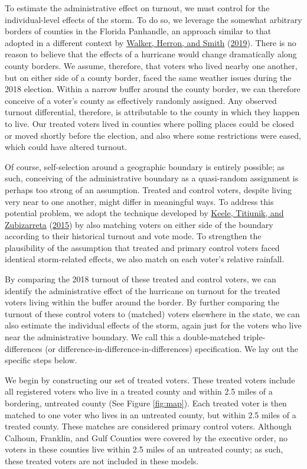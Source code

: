 \documentclass[
  12pt,
]{article}
\begin{document}
To estimate the administrative effect on turnout, we must control for the individual-level effects of the storm. To do so, we leverage the somewhat arbitrary borders of counties in the Florida Panhandle, an approach similar to that adopted in a different context by \protect\hyperlink{ref-Walker2019}{Walker, Herron, and Smith} (\protect\hyperlink{ref-Walker2019}{2019}). There is no reason to believe that the effects of a hurricane would change dramatically along county borders. We assume, therefore, that voters who lived nearby one another, but on either side of a county border, faced the same weather issues during the 2018 election. Within a narrow buffer around the county border, we can therefore conceive of a voter's county as effectively randomly assigned. Any observed turnout differential, therefore, is attributable to the county in which they happen to live. Our treated voters lived in counties where polling places could be closed or moved shortly before the election, and also where some restrictions were eased, which could have altered turnout.

Of course, self-selection around a geographic boundary is entirely possible; as such, conceiving of the administrative boundary as a quasi-random assignment is perhaps too strong of an assumption. Treated and control voters, despite living very near to one another, might differ in meaningful ways. To address this potential problem, we adopt the technique developed by \protect\hyperlink{ref-Keele2015a}{Keele, Titiunik, and Zubizarreta} (\protect\hyperlink{ref-Keele2015a}{2015}) by also matching voters on either side of the boundary according to their historical turnout and vote mode. To strengthen the plausibility of the assumption that treated and primary control voters faced identical storm-related effects, we also match on each voter's relative rainfall.

By comparing the 2018 turnout of these treated and control voters, we can identify the administrative effect of the hurricane on turnout for the treated voters living within the buffer around the border. By further comparing the turnout of these control voters to (matched) voters elsewhere in the state, we can also estimate the individual effects of the storm, again just for the voters who live near the administrative boundary. We call this a double-matched triple-differences (or difference-in-difference-in-differences) specification. We lay out the specific steps below.

We begin by constructing our set of treated voters. These treated voters include all registered voters who live in a treated county and within 2.5 miles of a bordering, untreated county (See Figure \ref{fig:map}). Each treated voter is then matched to one voter who lives in an untreated county, but within 2.5 miles of a treated county. These matches are considered primary control voters. Although Calhoun, Franklin, and Gulf Counties were covered by the executive order, no voters in these counties live within 2.5 miles of an untreated county; as such, these treated voters are not included in these models.
\end{document}
